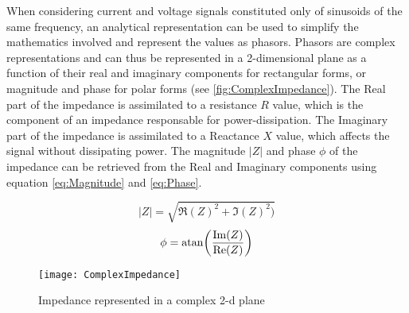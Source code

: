 When considering current and voltage signals constituted only of sinusoids of the same frequency, an analytical representation can be used to simplify the mathematics involved and represent the values as phasors. Phasors are complex representations and can thus be represented in a 2-dimensional plane as a function of their real and imaginary components for rectangular forms, or magnitude and phase for polar forms (see \autoref{fig:ComplexImpedance}). The Real part of the impedance is assimilated to a resistance $R$ value, which is the component of an impedance responsable for power-dissipation. The Imaginary part of the impedance is assimilated to a Reactance $X$ value, which affects the signal without dissipating power. The magnitude $\lvert Z \rvert$ and phase $\phi$ of the impedance can be retrieved from the Real and Imaginary components using equation \autoref{eq:Magnitude} and \autoref{eq:Phase}. \par
\begin{equation}
    \label{eq:Magnitude}
    \lvert Z \rvert = \sqrt{\Re(Z)^2+\Im(Z)^2)}
\end{equation}
\begin{equation}
    \label{eq:Phase}
   \phi = \atan(\frac{\Im(Z)}{\Re(Z)})
\end{equation}
\begin{figure}[h]
    \centering
    \texttt{[image: ComplexImpedance]}
    \caption{Impedance represented in a complex 2-d plane}
    \label{fig:ComplexImpedance}
\end{figure}